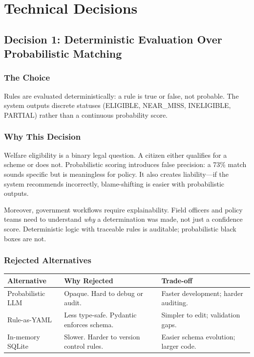 \documentclass[11pt,a4paper]{report}
\begin{document}
\chapter{Technical Decisions}

\section{Decision 1: Deterministic Evaluation Over Probabilistic Matching}

\subsection{The Choice}

Rules are evaluated deterministically: a rule is true or false, not probable. The system outputs discrete statuses (ELIGIBLE, NEAR\_MISS, INELIGIBLE, PARTIAL) rather than a continuous probability score.

\subsection{Why This Decision}

Welfare eligibility is a binary legal question. A citizen either qualifies for a scheme or does not. Probabilistic scoring introduces false precision: a 73\% match sounds specific but is meaningless for policy. It also creates liability—if the system recommends incorrectly, blame-shifting is easier with probabilistic outputs.

Moreover, government workflows require explainability. Field officers and policy teams need to understand \emph{why} a determination was made, not just a confidence score. Deterministic logic with traceable rules is auditable; probabilistic black boxes are not.

\subsection{Rejected Alternatives}

\begin{table}[H]
\centering
\small
\begin{tabular}{p{2cm}p{4cm}p{3cm}}
\toprule
Alternative & Why Rejected & Trade-off \\
\midrule
Probabilistic LLM & Opaque. Hard to debug or audit. & Faster development; harder auditing. \\
Rule-as-YAML & Less type-safe. Pydantic enforces schema. & Simpler to edit; validation gaps. \\
In-memory SQLite & Slower. Harder to version control rules. & Easier schema evolution; larger code. \\
\bottomrule
\end{tabular}
\end{table}
\end{document}
